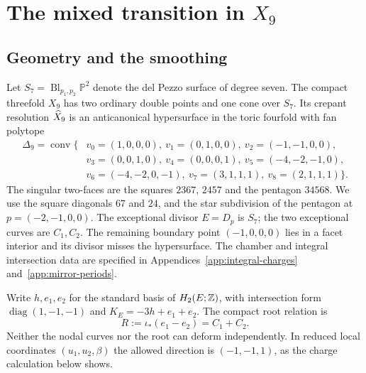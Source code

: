 \section{The mixed transition in \texorpdfstring{$X_9$}{X9}}
\label{sec:examples}\label{subsec:x9}

\subsection{Geometry and the smoothing}

Let $S_7=\operatorname{Bl}_{p_1,p_2}\mathbb P^2$ denote the del Pezzo
surface of degree seven. The compact threefold $X_9$ has two ordinary
double points and one cone over $S_7$. Its crepant resolution
$\widehat X_9$ is an anticanonical hypersurface in the toric fourfold with
fan polytope
\begin{equation}
\begin{split}
\Delta_9=\operatorname{conv}\{&v_0=(1,0,0,0),\ v_1=(0,1,0,0),\ v_2=(-1,-1,0,0),\\
&v_3=(0,0,1,0),\ v_4=(0,0,0,1),\ v_5=(-4,-2,-1,0),\\
&v_6=(-4,-2,0,-1),\ v_7=(3,1,1,1),\ v_8=(2,1,1,1)\}.
\end{split}
\label{eq:x9-polytope}
\end{equation}
The singular two-faces are the squares $2367$, $2457$ and the
pentagon $34568$. We use the square diagonals $67$ and $24$, and
the star subdivision of the pentagon at $p=(-2,-1,0,0)$.
The exceptional divisor $E=D_p$ is $S_7$; the two exceptional
curves are $C_1,C_2$. The remaining boundary point $(-1,0,0,0)$
lies in a facet interior and its divisor misses the hypersurface.
The chamber and integral intersection data are specified in
Appendices~\ref{app:integral-charges} and~\ref{app:mirror-periods}.

Write $h,e_1,e_2$ for the standard basis of $H_2(E;\mathbb Z)$,
with intersection form $\operatorname{diag}(1,-1,-1)$ and
$K_E=-3h+e_1+e_2$. The compact root relation is
\begin{equation}
 R:=\iota_*(e_1-e_2)=C_1+C_2.
 \label{eq:x9-root-relation}
\end{equation}
Neither the nodal curves nor the root can deform independently.
In reduced local coordinates $(u_1,u_2,\beta)$ the allowed
direction is $(-1,-1,1)$, as the charge calculation below shows.

